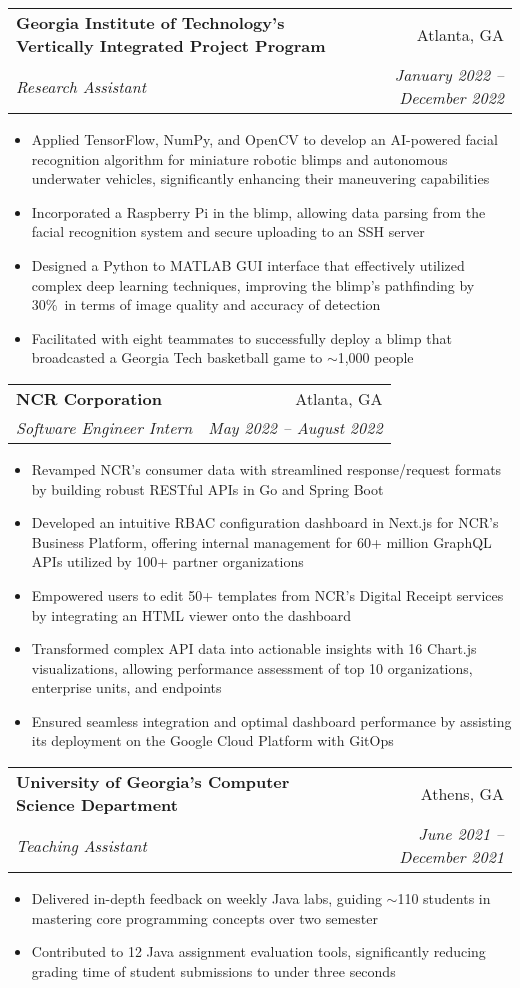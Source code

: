 \documentclass[letterpaper,10pt]{article}
\makeatletter
\newcommand{\resumeItem}[1]{
  \item\small{
    {#1 \vspace{-2pt}}
  }
}
\newcommand{\resumeSubheading}[4]{
  \vspace{-2pt}\item
    \begin{tabular*}{0.97\textwidth}[t]{l@{\extracolsep{\fill}}r}
      \textbf{#1} & #2 \\
      \textit{\small#3} & \textit{\small #4} \\
    \end{tabular*}\vspace{-7pt}
}
\newcommand{\resumeItemListStart}{\begin{itemize}}
\newcommand{\resumeItemListEnd}{\end{itemize}\vspace{-5pt}}
\makeatother
\begin{document}
    \resumeSubheading
      {Georgia Institute of Technology’s Vertically Integrated Project Program}{Atlanta, GA}
      {Research Assistant}{January 2022 -- December 2022}
      \resumeItemListStart
        \resumeItem{Applied TensorFlow, NumPy, and OpenCV to develop an AI-powered facial recognition algorithm for miniature robotic blimps and autonomous underwater vehicles, significantly enhancing their maneuvering capabilities}
        \resumeItem{Incorporated a Raspberry Pi in the blimp, allowing data parsing from the facial recognition system and secure uploading to an SSH server}\\
        \resumeItem{Designed a Python to MATLAB GUI interface that effectively utilized complex deep learning techniques, improving the blimp's pathfinding by 30\%\ in terms of image quality and accuracy of detection}
        \resumeItem{Facilitated with eight teammates to successfully deploy a blimp that broadcasted a Georgia Tech basketball game to $\sim$1,000 people}
    \resumeItemListEnd

    \resumeSubheading
      {NCR Corporation}{Atlanta, GA}
      {Software Engineer Intern}{May 2022 -- August 2022}
      \resumeItemListStart
        \resumeItem{Revamped NCR's consumer data with streamlined response/request formats by building robust RESTful APIs in Go and Spring Boot}
        \resumeItem{Developed an intuitive RBAC configuration dashboard in Next.js for NCR's Business Platform, offering internal management for 60+ million GraphQL APIs utilized by 100+ partner organizations}
        \resumeItem{Empowered users to edit 50+ templates from NCR's Digital Receipt services by integrating an HTML viewer onto the dashboard}
        \resumeItem{Transformed complex API data into actionable insights with 16 Chart.js visualizations, allowing performance assessment of top 10 organizations, enterprise units, and endpoints}
        \resumeItem{Ensured seamless integration and optimal dashboard performance by assisting its deployment on the Google Cloud Platform with GitOps}
      \resumeItemListEnd

    \resumeSubheading
    {University of Georgia’s Computer Science Department}{Athens, GA}
    {Teaching Assistant}{June 2021 -- December 2021}
    \resumeItemListStart
      \resumeItem{Delivered in-depth feedback on weekly Java labs, guiding $\sim$110 students in mastering core programming concepts over two semester}
      \resumeItem{Contributed to 12 Java assignment evaluation tools, significantly reducing grading time of student submissions to under three seconds}
    \resumeItemListEnd
\end{document}
